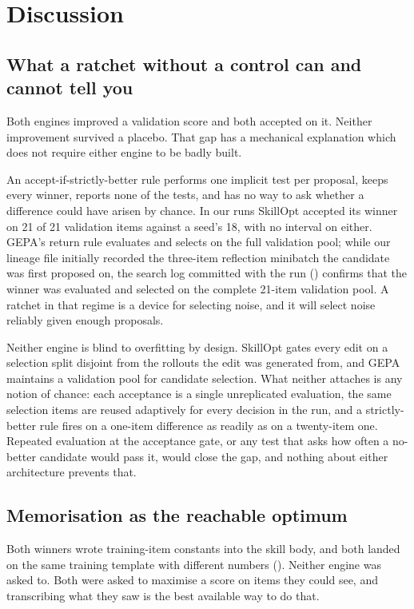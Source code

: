 \section{Discussion}
\label{sec:discussion}

\subsection{What a ratchet without a control can and cannot tell you}

Both engines improved a validation score and both accepted on it. Neither
improvement survived a placebo. That gap has a mechanical explanation which
does not require either engine to be badly built.

An accept-if-strictly-better rule performs one implicit test per proposal,
keeps every winner, reports none of the tests, and has no way to ask whether a
difference could have arisen by chance. In our runs SkillOpt accepted its
winner on 21 of 21 validation items against a seed's 18, with no interval on
either. GEPA's return rule evaluates and selects on the full validation pool;
while our lineage file initially recorded the three-item reflection minibatch
the candidate was first proposed on, the search log committed with the run
() confirms that the winner was evaluated and selected
on the complete 21-item validation pool. A ratchet in that regime is a device
for selecting noise, and it will select noise reliably given enough proposals.

Neither engine is blind to overfitting by design. SkillOpt gates every edit
on a selection split disjoint from the rollouts the edit was generated from,
and GEPA maintains a validation pool for candidate selection. What neither
attaches is any notion of chance: each acceptance is a single
unreplicated evaluation, the same selection items are reused adaptively for
every decision in the run, and a strictly-better rule fires on a one-item
difference as readily as on a twenty-item one. Repeated evaluation at the
acceptance gate, or any test that asks how often a no-better candidate would
pass it, would close the gap, and nothing about either architecture prevents
that.

\subsection{Memorisation as the reachable optimum}

Both winners wrote training-item constants into the skill body, and both
landed on the same training template with different numbers
(). Neither engine was asked to. Both were asked to
maximise a score on items they could see, and transcribing what they saw is
the best available way to do that.

